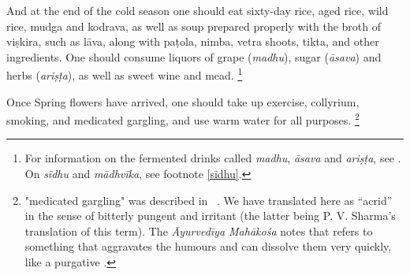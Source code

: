 \begin{translation}
And at the end of the cold season one should eat sixty-day rice, aged rice,       %
wild rice, \gls{mudga} and \gls{kodrava}, as well as soup prepared properly %
with the broth of \gls{viṣkira}, such as \gls{lāva}, %
along with \gls{paṭola}, %
\gls{nimba}, %
\gls{vetra} shoots, %
\gls{tikta}, %
and other ingredients. %
One should consume liquors of grape (\emph{madhu}), sugar (\emph{āsava}) and herbs (\emph{ariṣṭa}), as well as sweet wine and mead.%
    \footnote{For information on the fermented drinks called \emph{madhu}, \emph{āsava} and \emph{ariṣṭa}, see \cite[47–49, 53]{mchu-2021a}. On \emph{sīdhu} and \emph{mādhvīka}, see footnote \ref{sīdhu}.\label{liquors}}

\item[43] 
Once Spring flowers have arrived, %
one should take up exercise, collyrium, smoking, %
and  medicated gargling, %
and use warm water for all purposes.%
    \footnote{ "medicated gargling" was described in \SS\ . We have translated  here as ``acrid'' in the sense of bitterly pungent and irritant (the latter being P. V. Sharma's translation of this term). The \emph{Āyurvedīya Mahākośa} notes that  refers to something that aggravates the humours and can dissolve them very quickly, like a purgative \citep[374]{josi-maha}.}


\end{translation}
